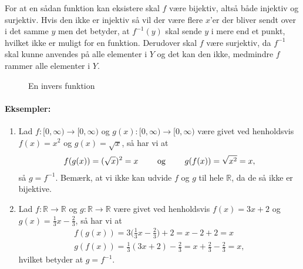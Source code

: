 For at en sådan funktion kan eksistere skal $f$ være bijektiv, altså både injektiv og surjektiv. Hvis den ikke er injektiv så vil der være flere $x$'er der bliver sendt over i det samme $y$ men det betyder, at $f^{-1}(y)$ skal sende $y$ i mere end et punkt, hvilket ikke er muligt for en funktion. Derudover skal $f$ være surjektiv, da $f^{-1}$ skal kunne anvendes på alle elementer i $Y$ og det kan den ikke, medmindre $f$ rammer alle elementer i $Y$. 


\begin{figure}[!htbp]
  \pgfplotsset{width=0.5\textwidth,compat=1.11}
  \centering
  \caption{En invers funktion}
  \label{fig:funktioner2to}
\end{figure}

\paragraph*{Eksempler:}
\begin{enumerate}
\item Lad $f \colon [0,\infty) \to [0,\infty)$ og $g(x) \colon [0,\infty) \to [0,\infty)$ være givet ved henholdsvis $f(x)=x^2$ og $g(x)=\sqrt{x}$, så har vi at
\begin{align*}
f(g(x))=(\sqrt{x})^2=x \qquad \textup{ og } \qquad g(f(x)) = \sqrt{x^2} = x,
\end{align*}
så $g=f^{-1}$. Bemærk, at vi ikke kan udvide $f$ og $g$ til hele $\mathbb{R}$, da de så ikke er bijektive.
\item Lad $f \colon \mathbb{R} \to \mathbb{R}$ og $g \colon \mathbb{R} \to \mathbb{R}$ være givet ved henholdsvis $f(x)=3x+2$ og $g(x)=\frac{1}{3}x-\frac{2}{3}$, så har vi at
\begin{align*}
f(g(x))= 3\Big(\frac{1}{3}x - \frac{2}{3}\Big) + 2 = x - 2 + 2 = x \\
g(f(x)) = \frac{1}{3}(3x+2) - \frac{2}{3} = x + \frac{2}{3} - \frac{2}{3} = x ,
\end{align*}
hvilket betyder at $g=f^{-1}$.
\end{enumerate}